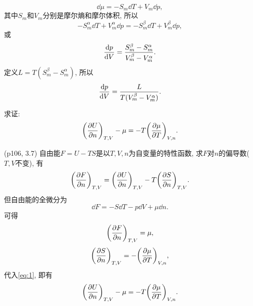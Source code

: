\begin{questions}
\begin{solution}
    \begin{equation}
      \dd \mu = -S_m \dd T + V_m\dd p,
    \end{equation}
    其中$S_m$和$V_m$分别是摩尔熵和摩尔体积, 所以
    \begin{equation}
      -S_m^\alpha \dd T + V_m^\alpha\dd p = -S_m^\beta \dd T + V_m^\beta\dd p,
    \end{equation}
    或
    \begin{equation}
      \dv{p}{V} = \frac{S_m^\beta - S_m^\alpha}{V_m^\beta - V_m^\alpha}.
    \end{equation}
    定义$L=T(S_m^\beta - S_m^\alpha)$, 所以
    \begin{equation}
      \dv{p}{V}  = \frac{L}{T(V_m^\beta - V_m^\alpha)}.
    \end{equation}
  \end{solution}
  \question 求证:
  \begin{equation}
    \qty(\pdv{U}{n})_{T,V} - \mu = -T\qty(\pdv{\mu}{T})_{V,n}.
  \end{equation}
  \begin{solution}
    (p106, 3.7) 自由能$F=U-TS$是以$T, V, n$为自变量的特性函数, 求$F$对$n$的偏导数($T,V$不变), 有
    \begin{equation}
      \qty(\pdv{F}{n})_{T,V} = \qty(\pdv{U}{n})_{T,V} - T\qty(\pdv{S}{n})_{T,V}.
      \label{eq:1}
    \end{equation}
    但自由能的全微分为
    \begin{equation}
      \dd F = -S\dd T - p\dd V +\mu\dd n.
    \end{equation}
    可得
    \begin{equation}
      \qty(\pdv{F}{n})_{T,V} = \mu,
    \end{equation}
    \begin{equation}
      \qty(\pdv{S}{n})_{T,V} = -\qty(\pdv{\mu}{T})_{V,n},
    \end{equation}
    代入\eqref{eq:1}, 即有
    \begin{equation}
      \qty(\pdv{U}{n})_{T,V} - \mu = -T\qty(\pdv{\mu}{T})_{V,n}.
    \end{equation}
  \end{solution}
\end{questions}